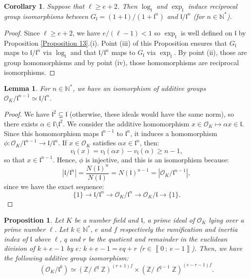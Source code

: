 \documentclass[a4paper,10pt]{report}
\theoremstyle{definition}
\theoremstyle{plain}
\newtheorem{Proposition}[Definition]{Proposition}
\newtheorem{Lemma}[Definition]{Lemma}
\newtheorem{Corollary}[Definition]{Corollary}
\theoremstyle{definition}
\newcommand{\N}{\mathbb{N}}
\newcommand{\Z}{\mathbb{Z}}
\newcommand{\mO}{\mathcal{O}}
\renewcommand{\i}[2]{\left\llbracket #1~;~#2\right\rrbracket}
\renewcommand{\(}{\left(}
\renewcommand{\)}{\right)}
\newcommand{\mf}[1]{\mathfrak{#1}}
\begin{document}
\begin{Corollary}
Suppose that $\ell\geq e+2$. Then $\log_{\mf{l}}$ and $\exp_{\mf{l}}$ induce reciprocal group isomorphisms between $G_{\mf{l}}=(1+\mf{l})/(1+\mf{l}^n)$ and $\mf{l}/\mf{l}^n$ (for $n\in\N^*$).
\end{Corollary}

\begin{proof}
Since $\ell\geq e+2$, we have $e/(\ell-1)<1$ so $\exp_{\mf{l}}$ is well defined on $\mf{l}$ by Proposition \ref{Proposition 13}.(i). Point (iii) of this Proposition ensures that $G_{\mf{l}}$ maps to $\mf{l}/\mf{l}^n$ via $\log_{\mf{l}}$ and that $\mf{l}/\mf{l}^n$ maps to $G_{\mf{l}}$ via $\exp_{\mf{l}}$. By point (ii), those are group homomorphisms and by point (iv), those homomorphisms are reciprocal isomorphisms.
\end{proof}

\begin{Lemma}\label{Lemma 17}
For $n\in\N^*$, we have an isomorphism of additive groups $\mO_K/\mf{l}^{n-1}\simeq \mf{l}/\mf{l}^{n}$.
\end{Lemma}

\begin{proof}
We have $\mf{l}^2\subsetneq \mf{l}$ (otherwise, these ideals would have the same norm), so there exists $\alpha\in\mf{l}\setminus\mf{l}^2$. We consider the additive homomorphism $x\in\mO_K\longmapsto \alpha x\in\mf{l}$. Since this homomorphism maps $\mf{l}^{n-1}$ to $\mf{l}^n$, it induces a homomorphism $\phi:\mO_K/\mf{l}^{n-1}\longrightarrow \mf{l}/\mf{l}^{n}$. If $x\in\mO_K$ satisfies $\alpha x\in\mf{l}^n$, then:
\[v_{\mf{l}}(x)=v_{\mf{l}}(\alpha x)-v_{\mf{l}}(\alpha)\geq n-1,\]
so that $x\in \mf{l}^{n-1}$. Hence, $\phi$ is injective, and this is an isomorphism because:
\[|\mf{l}/\mf{l}^n|=\frac{N(\mf{l})^n}{N(\mf{l})}=N(\mf{l})^{n-1}=|\mO_K/\mf{l}^{n-1}|,\]
since we have the exact sequence:
\[\{1\}\longrightarrow \mf{l}/\mf{l}^n\longrightarrow \mO_K/\mf{l}^n\longrightarrow\mO_K/\mf{l}\longrightarrow\{1\}.\]
\end{proof}

\begin{Proposition}\label{Proposition 14}
Let  $K$ be a number field and $\mf{l}$, a prime ideal of $\mO_K$ lying over a prime number $\ell$. Let $k\in\N^*$, $e$ and $f$ respectively the ramification and inertia index of $\mf{l}$ above $\ell$, $q$ and $r$ be the quotient and remainder in the euclidean division of $k+e-1$ by $e$: $k+e-1=eq+r$ ($r\in\i{0}{e-1}$). Then, we have the following additive group isomorphism:
\[(\mO_K/\mf{l}^k)\simeq (\Z/\ell^q\Z)^{(r+1)f}\times(\Z/\ell^{q-1}\Z)^{(e-r-1)f}.\]
\end{Proposition}
\end{document}
